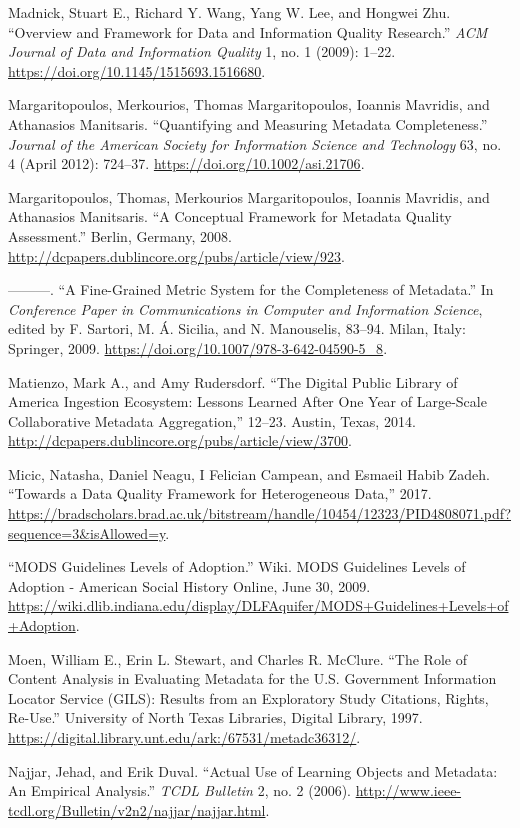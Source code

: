 Madnick, Stuart E., Richard Y. Wang, Yang W. Lee, and Hongwei Zhu. “Overview and Framework for Data and Information Quality Research.” \emph{ACM Journal of Data and Information Quality} 1, no. 1 (2009): 1–22. \url{https://doi.org/10.1145/1515693.1516680}.

Margaritopoulos, Merkourios, Thomas Margaritopoulos, Ioannis Mavridis, and Athanasios Manitsaris. “Quantifying and Measuring Metadata Completeness.” \emph{Journal of the American Society for Information Science and Technology} 63, no. 4 (April 2012): 724–37. \url{https://doi.org/10.1002/asi.21706}.

Margaritopoulos, Thomas, Merkourios Margaritopoulos, Ioannis Mavridis, and Athanasios Manitsaris. “A Conceptual Framework for Metadata Quality Assessment.” Berlin, Germany, 2008. \url{http://dcpapers.dublincore.org/pubs/article/view/923}.

———. “A Fine-Grained Metric System for the Completeness of Metadata.” In \emph{Conference Paper in Communications in Computer and Information Science}, edited by F. Sartori, M. Á. Sicilia, and N. Manouselis, 83–94. Milan, Italy: Springer, 2009. \url{https://doi.org/10.1007/978-3-642-04590-5_8}.

Matienzo, Mark A., and Amy Rudersdorf. “The Digital Public Library of America Ingestion Ecosystem: Lessons Learned After One Year of Large-Scale Collaborative Metadata Aggregation,” 12–23. Austin, Texas, 2014. \url{http://dcpapers.dublincore.org/pubs/article/view/3700}.

Micic, Natasha, Daniel Neagu, I Felician Campean, and Esmaeil Habib Zadeh. “Towards a Data Quality Framework for Heterogeneous Data,” 2017. \url{https://bradscholars.brad.ac.uk/bitstream/handle/10454/12323/PID4808071.pdf?sequence=3\&isAllowed=y}.

“MODS Guidelines Levels of Adoption.” Wiki. MODS Guidelines Levels of Adoption - American Social History Online, June 30, 2009. \url{https://wiki.dlib.indiana.edu/display/DLFAquifer/MODS+Guidelines+Levels+of+Adoption}.

Moen, William E., Erin L. Stewart, and Charles R. McClure. “The Role of Content Analysis in Evaluating Metadata for the U.S. Government Information Locator Service (GILS): Results from an Exploratory Study Citations, Rights, Re-Use.” University of North Texas Libraries, Digital Library, 1997. \url{https://digital.library.unt.edu/ark:/67531/metadc36312/}.

Najjar, Jehad, and Erik Duval. “Actual Use of Learning Objects and Metadata: An Empirical Analysis.” \emph{TCDL Bulletin} 2, no. 2 (2006). \url{http://www.ieee-tcdl.org/Bulletin/v2n2/najjar/najjar.html}.

